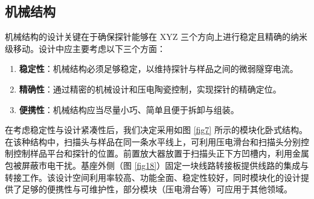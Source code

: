 \documentclass[zihao=-4]{ctexart}
\begin{document}
\begin{spacing}{1.5}
\begin{itemize}
		\end{itemize}
	
	
	
	
	
	
	
	
	\subsection{机械结构}
		机械结构的设计关键在于确保探针能够在 XYZ 三个方向上进行稳定且精确的纳米级移动。设计中应主要考虑以下三个方面：
		\begin{enumerate}
			\item \textbf{稳定性}：机械结构必须足够稳定，以维持探针与样品之间的微弱隧穿电流。
			\item \textbf{精确性}：通过精密的机械设计和压电陶瓷控制，实现探针的精确定位。
			\item \textbf{便携性}：机械结构应当尽量小巧、简单且便于拆卸与组装。
		\end{enumerate}
		
		在考虑稳定性与设计紧凑性后，我们决定采用如图 \ref{fig7} 所示的模块化卧式结构。在该种结构中，扫描头与样品在同一条水平线上，可利用压电滑台和扫描头分别控制控制样品平台和探针的位置。前置放大器放置于扫描头正下方凹槽内，利用金属包被屏蔽市电干扰。基座外侧（图 \ref{fig18}）固定一块线路转接板提供线路的集成与转接工作。该设计空间利用率较高、功能全面、稳定性较好，同时模块化的设计提供了足够的便携性与可维护性，部分模块（压电滑台等）可应用于其他领域。
		\begin{figure}[!h]
			\centering
			\begin{subfigure}{0.8\textwidth}
				\centering
\end{subfigure}
\end{figure}
\end{spacing}
\end{document}
